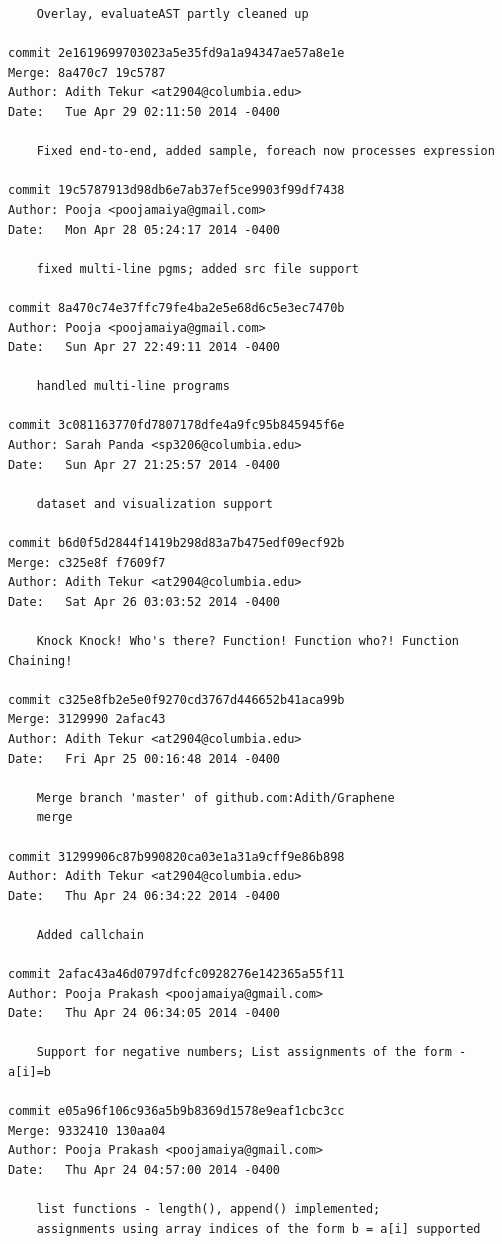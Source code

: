 \documentclass[a4paper]{article}
\begin{document}
\begin{verbatim}
    Overlay, evaluateAST partly cleaned up

commit 2e1619699703023a5e35fd9a1a94347ae57a8e1e
Merge: 8a470c7 19c5787
Author: Adith Tekur <at2904@columbia.edu>
Date:   Tue Apr 29 02:11:50 2014 -0400

    Fixed end-to-end, added sample, foreach now processes expression

commit 19c5787913d98db6e7ab37ef5ce9903f99df7438
Author: Pooja <poojamaiya@gmail.com>
Date:   Mon Apr 28 05:24:17 2014 -0400

    fixed multi-line pgms; added src file support

commit 8a470c74e37ffc79fe4ba2e5e68d6c5e3ec7470b
Author: Pooja <poojamaiya@gmail.com>
Date:   Sun Apr 27 22:49:11 2014 -0400

    handled multi-line programs

commit 3c081163770fd7807178dfe4a9fc95b845945f6e
Author: Sarah Panda <sp3206@columbia.edu>
Date:   Sun Apr 27 21:25:57 2014 -0400

    dataset and visualization support

commit b6d0f5d2844f1419b298d83a7b475edf09ecf92b
Merge: c325e8f f7609f7
Author: Adith Tekur <at2904@columbia.edu>
Date:   Sat Apr 26 03:03:52 2014 -0400

    Knock Knock! Who's there? Function! Function who?! Function Chaining!

commit c325e8fb2e5e0f9270cd3767d446652b41aca99b
Merge: 3129990 2afac43
Author: Adith Tekur <at2904@columbia.edu>
Date:   Fri Apr 25 00:16:48 2014 -0400

    Merge branch 'master' of github.com:Adith/Graphene
    merge

commit 31299906c87b990820ca03e1a31a9cff9e86b898
Author: Adith Tekur <at2904@columbia.edu>
Date:   Thu Apr 24 06:34:22 2014 -0400

    Added callchain

commit 2afac43a46d0797dfcfc0928276e142365a55f11
Author: Pooja Prakash <poojamaiya@gmail.com>
Date:   Thu Apr 24 06:34:05 2014 -0400

    Support for negative numbers; List assignments of the form - a[i]=b

commit e05a96f106c936a5b9b8369d1578e9eaf1cbc3cc
Merge: 9332410 130aa04
Author: Pooja Prakash <poojamaiya@gmail.com>
Date:   Thu Apr 24 04:57:00 2014 -0400

    list functions - length(), append() implemented; 
    assignments using array indices of the form b = a[i] supported


\end{verbatim}
\end{document}
